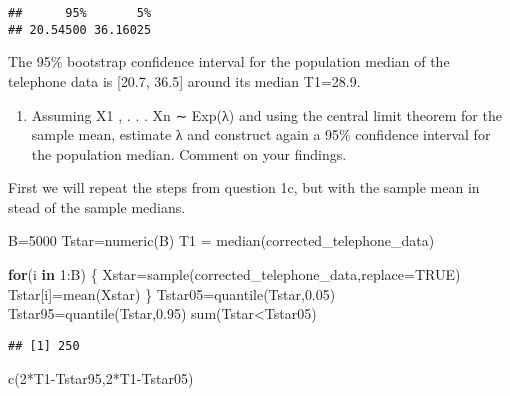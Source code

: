 \documentclass[
]{article}
\newenvironment{Shaded}{\begin{snugshade}}{\end{snugshade}}
\newcommand{\AttributeTok}[1]{\textcolor[rgb]{0.77,0.63,0.00}{#1}}
\newcommand{\ConstantTok}[1]{\textcolor[rgb]{0.00,0.00,0.00}{#1}}
\newcommand{\ControlFlowTok}[1]{\textcolor[rgb]{0.13,0.29,0.53}{\textbf{#1}}}
\newcommand{\DecValTok}[1]{\textcolor[rgb]{0.00,0.00,0.81}{#1}}
\newcommand{\FloatTok}[1]{\textcolor[rgb]{0.00,0.00,0.81}{#1}}
\newcommand{\FunctionTok}[1]{\textcolor[rgb]{0.00,0.00,0.00}{#1}}
\newcommand{\NormalTok}[1]{#1}
\newcommand{\OtherTok}[1]{\textcolor[rgb]{0.56,0.35,0.01}{#1}}
\newcommand{\SpecialCharTok}[1]{\textcolor[rgb]{0.00,0.00,0.00}{#1}}
\providecommand{\tightlist}{%
  \setlength{\itemsep}{0pt}\setlength{\parskip}{0pt}}
\begin{document}
\begin{verbatim}
##      95%       5% 
## 20.54500 36.16025
\end{verbatim}

The 95\% bootstrap confidence interval for the population median of the
telephone data is {[}20.7, 36.5{]} around its median T1=28.9.

\begin{enumerate}
\def\labelenumi{\alph{enumi})}
\setcounter{enumi}{3}
\tightlist
\item
  Assuming X1 , . . . Xn ∼ Exp(λ) and using the central limit theorem
  for the sample mean, estimate λ and construct again a 95\% confidence
  interval for the population median. Comment on your findings.
\end{enumerate}

First we will repeat the steps from question 1c, but with the sample
mean in stead of the sample medians.

\begin{Shaded}
\begin{Highlighting}[]
\NormalTok{B}\OtherTok{=}\DecValTok{5000}
\NormalTok{Tstar}\OtherTok{=}\FunctionTok{numeric}\NormalTok{(B)}
\NormalTok{T1 }\OtherTok{=} \FunctionTok{median}\NormalTok{(corrected\_telephone\_data)}

\ControlFlowTok{for}\NormalTok{(i }\ControlFlowTok{in} \DecValTok{1}\SpecialCharTok{:}\NormalTok{B) \{}
\NormalTok{  Xstar}\OtherTok{=}\FunctionTok{sample}\NormalTok{(corrected\_telephone\_data,}\AttributeTok{replace=}\ConstantTok{TRUE}\NormalTok{)}
\NormalTok{  Tstar[i]}\OtherTok{=}\FunctionTok{mean}\NormalTok{(Xstar) }
\NormalTok{  \}}
\NormalTok{Tstar05}\OtherTok{=}\FunctionTok{quantile}\NormalTok{(Tstar,}\FloatTok{0.05}\NormalTok{)}
\NormalTok{Tstar95}\OtherTok{=}\FunctionTok{quantile}\NormalTok{(Tstar,}\FloatTok{0.95}\NormalTok{)}
\FunctionTok{sum}\NormalTok{(Tstar}\SpecialCharTok{\textless{}}\NormalTok{Tstar05)}
\end{Highlighting}
\end{Shaded}

\begin{verbatim}
## [1] 250
\end{verbatim}

\begin{Shaded}
\begin{Highlighting}[]
\FunctionTok{c}\NormalTok{(}\DecValTok{2}\SpecialCharTok{*}\NormalTok{T1}\SpecialCharTok{{-}}\NormalTok{Tstar95,}\DecValTok{2}\SpecialCharTok{*}\NormalTok{T1}\SpecialCharTok{{-}}\NormalTok{Tstar05)}
\end{Highlighting}
\end{Shaded}
\end{document}
